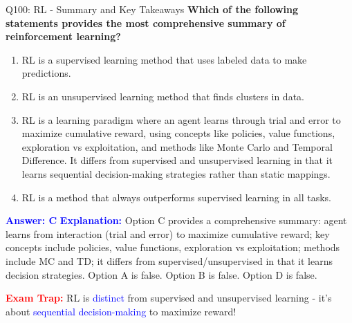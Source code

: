 \documentclass[8pt]{beamer}
\begin{document}
	\begin{frame}{Q100: RL - Summary and Key Takeaways}
		\fontsize{6.5}{7.5}\selectfont
		\textbf{Which of the following statements provides the most comprehensive summary of reinforcement learning?}
		
		\begin{enumerate}
			\item RL is a supervised learning method that uses labeled data to make predictions.
			\item RL is an unsupervised learning method that finds clusters in data.
			\item RL is a learning paradigm where an agent learns through trial and error to maximize cumulative reward, using concepts like policies, value functions, exploration vs exploitation, and methods like Monte Carlo and Temporal Difference. It differs from supervised and unsupervised learning in that it learns sequential decision-making strategies rather than static mappings.
			\item RL is a method that always outperforms supervised learning in all tasks.
		\end{enumerate}
		
		\vspace{0.1cm}
		\textcolor{blue}{\textbf{Answer: C}}
		\vspace{0.1cm}
		\textcolor{blue}{\textbf{Explanation:}} Option C provides a comprehensive summary: agent learns from interaction (trial and error) to maximize cumulative reward; key concepts include policies, value functions, exploration vs exploitation; methods include MC and TD; it differs from supervised/unsupervised in that it learns decision strategies. Option A is false. Option B is false. Option D is false.
		
		\textcolor{red}{\textbf{Exam Trap:}} RL is \textcolor{blue}{distinct} from supervised and unsupervised learning - it's about \textcolor{blue}{sequential decision-making} to maximize reward!
	\end{frame}
	
\end{document}
